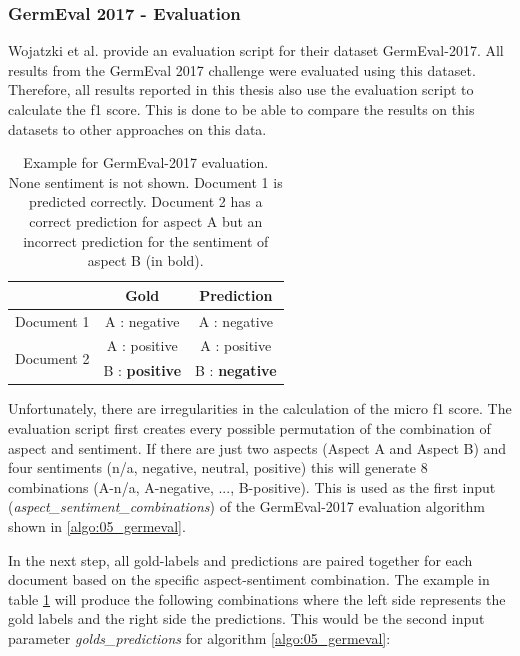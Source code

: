 \subsubsection*{GermEval 2017 - Evaluation}

Wojatzki et al. \cite{Wojatzki} provide an evaluation script for their dataset GermEval-2017. All results from the GermEval 2017 challenge were evaluated using this dataset. Therefore, all results reported in this thesis also use the evaluation script to calculate the f1 score. This is done to be able to compare the results on this datasets to other approaches on this data.

\begin{table}[hbt]
	\centering
	\label{tab:05_germevalEvaluationExample}
	\caption{Example for GermEval-2017 evaluation. None sentiment is not shown. Document 1 is predicted correctly. Document 2 has a correct prediction for aspect A but an incorrect prediction for the sentiment of aspect B {(in bold)}.}
	\begin{tabular}{@{}lcc}
		\toprule 
		& \textbf{Gold} & \textbf{Prediction} \\ 
		\hline 
		Document 1 & A : negative & A : negative \\ 
		\hline 
		\multirow{2}{*}{Document 2} & A : positive & A : positive \\ 
		& B : \textbf{positive} & B : \textbf{negative} \\ 
		\hline 
	\end{tabular}
\end{table}

Unfortunately, there are irregularities in the calculation of the micro f1 score. The evaluation script first creates every possible permutation of the combination of aspect and sentiment. If there are just two aspects {(Aspect A and Aspect B)} and four sentiments {(n/a, negative, neutral, positive)} this will generate 8 combinations {(A-n/a, A-negative, ..., B-positive)}. This is used as the first input {(\textit{aspect\_sentiment\_combinations})} of the GermEval-2017 evaluation algorithm shown in \ref{algo:05_germeval}.

In the next step, all gold-labels and predictions are paired together for each document based on the specific aspect-sentiment combination. The example in table \ref{tab:05_germevalEvaluationExample} will produce the following combinations where the left side represents the gold labels and the right side the predictions. This would be the second input parameter \textit{golds\_predictions} for algorithm \ref{algo:05_germeval}: 

